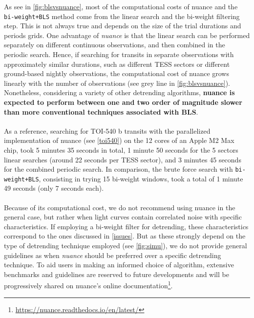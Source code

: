 \documentclass[modern]{aastex631}
\newcommand{\nuancemethod}{\textit{nuance}}
\newcommand{\nuancecode}{\textsf{nuance}}
\newcommand{\footlink}[1]{\footnote{\url{#1}}}
\begin{document}
As see in \autoref{fig:blsvsnuance}, most of the computational costs of \nuancecode{} and the \texttt{bi-weight+BLS} method come from the linear search and the bi-weight filtering step. This is not always true and depends on the size of the trial durations and periods grids. One advantage of \nuancemethod{} is that the linear search can be performed separately on different continuous observations, and then combined in the periodic search. Hence, if searching for transits in separate observations with approximately similar durations, such as different TESS sectors or different ground-based nightly observations, the computational cost of \nuancecode{} grows linearly with the number of observations (see grey line in \autoref{fig:blsvsnuance}). Nonetheless, considering a variety of other detrending algorithms, \textbf{\nuancecode{} is expected to perform between one and two order of magnitude slower than more conventional techniques associated with BLS}.\\\\ 
As a reference, searching for TOI-540 b transits with the parallelized implementation of \nuancecode{} (see \autoref{toi540}) on the 12 cores of an Apple M2 Max chip, took 5 minutes 35 seconds in total, 1 minute 50 seconds for the 5 sectors linear searches (around 22 seconds per TESS sector), and 3 minutes 45 seconds for the combined periodic search. In comparison, the brute force search with \texttt{bi-weight+BLS}, consisting in trying 15 bi-weight windows, took a total of 1 minute 49 seconds (only 7 seconds each).\\\\
Because of its computational cost, we do not recommend using \nuancecode{} in the general case, but rather when light curves contain correlated noise with specific characteristics. If employing a bi-weight filter for detrending, these characteristics correspond to the ones discussed in \autoref{issues}. But as these strongly depend on the type of detrending technique employed (see \autoref{fig:simu}), we do not provide general guidelines as when \nuancemethod{} should be preferred over a specific detrending technique. To aid users in making an informed choice of algorithm, extensive benchmarks and guidelines are reserved to future developments and will be progressively shared on \nuancecode{}'s online documentation\footlink{https://nuance.readthedocs.io/en/latest/}.
\end{document}
